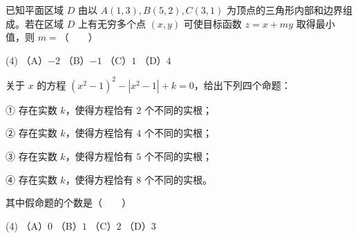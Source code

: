 \begin{question}
已知平面区域 $D$ 由以 $A(1,3),B(5,2),C(3,1)$ 为顶点的三角形内部和边界组成。若在区域 $D$ 上有无穷多个点 $(x,y)$ 可使目标函数 $z=x+my$ 取得最小值，则 $m=$\mbox{（　　）}

\begin{gkopts}(4)
\task （A）$-2$
\task （B）$-1$
\task （C）$1$
\task （D）$4$
\end{gkopts}

\end{question}
\begin{question}
关于 $x$ 的方程 $(x^2-1)^2-|x^2-1|+k=0$，给出下列四个命题：

① 存在实数 $k$，使得方程恰有 $2$ 个不同的实根；

② 存在实数 $k$，使得方程恰有 $4$ 个不同的实根；

③ 存在实数 $k$，使得方程恰有 $5$ 个不同的实根；

④ 存在实数 $k$，使得方程恰有 $8$ 个不同的实根。

其中假命题的个数是\mbox{（　　）}

\begin{gkopts}(4)
\task （A）$0$
\task （B）$1$
\task （C）$2$
\task （D）$3$
\end{gkopts}

\end{question}

